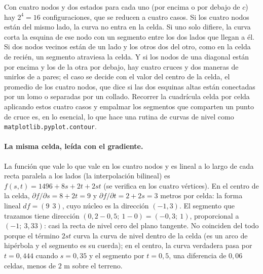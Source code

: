 \begin{center}
\end{center}

Con cuatro nodos y dos estados para cada uno (por encima o por debajo de \(c\)) hay
\(2^4=16\) configuraciones, que se reducen a cuatro casos. Si los cuatro nodos están del mismo
lado, la curva no entra en la celda. Si uno solo difiere, la curva corta la esquina de ese
nodo con un segmento entre los dos lados que llegan a él. Si dos nodos vecinos están de un
lado y los otros dos del otro, como en la celda de recién, un segmento atraviesa la celda.
Y si los nodos de una diagonal están por encima y los de la otra por debajo, hay cuatro
cruces y dos maneras de unirlos de a pares; el caso se decide con el valor del centro de la
celda, el promedio de los cuatro nodos, que dice si las dos esquinas altas están conectadas
por un lomo o separadas por un collado. Recorrer la cuadrícula celda por celda aplicando estos
cuatro casos y empalmar los segmentos que comparten un punto de cruce es, en lo esencial, lo que
hace una rutina de curvas de nivel como \texttt{matplotlib.pyplot.contour}.

\paragraph{La misma celda, leída con el gradiente.} La función que vale lo que vale en los
cuatro nodos y es lineal a lo largo de cada recta paralela a los lados (la interpolación
bilineal) es
\(f(s,t)=1496+8s+2t+2st\) (se verifica en los cuatro vértices). En el centro de la celda,
\(\partial f/\partial s=8+2t=9\) y \(\partial f/\partial t=2+2s=3\) metros por celda: la
forma lineal \(df=(9\ \ 3)\), cuyo núcleo es la dirección \((-1,3)\). El segmento que
trazamos tiene dirección \((0{,}2-0{,}5;\ 1-0)=(-0{,}3;\ 1)\), proporcional a
\((-1;\ 3{,}33)\): casi la recta de nivel cero del plano tangente. No coinciden del todo
porque el término \(2st\) curva la curva de nivel dentro de la celda (es un arco de hipérbola
y el segmento es su cuerda); en el centro, la curva verdadera pasa por \(t=0{,}444\) cuando
\(s=0{,}35\) y el segmento por \(t=0{,}5\), una diferencia de \(0{,}06\) celdas, menos de
\(2\) m sobre el terreno.

